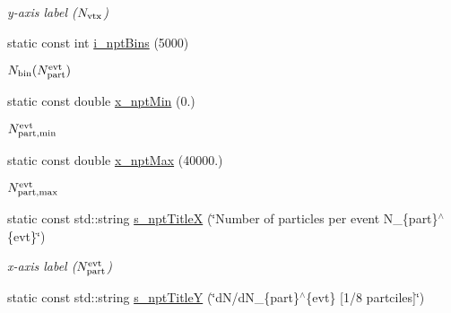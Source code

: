 \begin{CompactItemize}
\begin{CompactList}\small\item\em y-axis label ($N_{\rm vtx}$) \item\end{CompactList}\item 
\hypertarget{namespaceHistGroupCfg_722473d928a408c54b1699a23d441b1a}{
static const int \hyperlink{namespaceHistGroupCfg_722473d928a408c54b1699a23d441b1a}{i\_\-npt\-Bins} (5000)}
\label{namespaceHistGroupCfg_722473d928a408c54b1699a23d441b1a}

\begin{CompactList}\small\item\em $N_{\rm bin}(N_{\rm part}^{\rm evt})$ \item\end{CompactList}\item 
\hypertarget{namespaceHistGroupCfg_b998b1f6078374c0cd29f789dbc69697}{
static const double \hyperlink{namespaceHistGroupCfg_b998b1f6078374c0cd29f789dbc69697}{x\_\-npt\-Min} (0.)}
\label{namespaceHistGroupCfg_b998b1f6078374c0cd29f789dbc69697}

\begin{CompactList}\small\item\em $N_{\rm part,min}^{\rm evt}$ \item\end{CompactList}\item 
\hypertarget{namespaceHistGroupCfg_b420a67e1ca8ce142de877e95f0e1526}{
static const double \hyperlink{namespaceHistGroupCfg_b420a67e1ca8ce142de877e95f0e1526}{x\_\-npt\-Max} (40000.)}
\label{namespaceHistGroupCfg_b420a67e1ca8ce142de877e95f0e1526}

\begin{CompactList}\small\item\em $N_{\rm part,max}^{\rm evt}$ \item\end{CompactList}\item 
\hypertarget{namespaceHistGroupCfg_5adc9d85d68128b5006a7debe1093c9d}{
static const std::string \hyperlink{namespaceHistGroupCfg_5adc9d85d68128b5006a7debe1093c9d}{s\_\-npt\-Title\-X} (\char`\"{}Number of particles per event N\_\-\{part\}$^\wedge$\{evt\}\char`\"{})}
\label{namespaceHistGroupCfg_5adc9d85d68128b5006a7debe1093c9d}

\begin{CompactList}\small\item\em x-axis label ($N_{\rm part}^{\rm evt}$) \item\end{CompactList}\item 
\hypertarget{namespaceHistGroupCfg_a6e0a0a7d5cd077b622198ac575e19b8}{
static const std::string \hyperlink{namespaceHistGroupCfg_a6e0a0a7d5cd077b622198ac575e19b8}{s\_\-npt\-Title\-Y} (\char`\"{}d\-N/d\-N\_\-\{part\}$^\wedge$\{evt\} \mbox{[}1/8 partciles\mbox{]}\char`\"{})}
\label{namespaceHistGroupCfg_a6e0a0a7d5cd077b622198ac575e19b8}


\end{CompactItemize}
